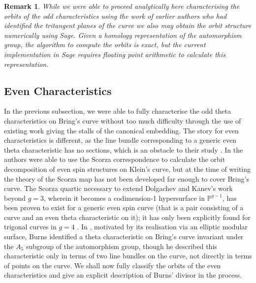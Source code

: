 \documentclass{amsart}
\newtheorem{remark}[theorem]{Remark}
\begin{document}
\begin{remark}
While we were able to proceed analytically here characterising the orbits of the odd characteristics using the  work of earlier authors who had identified the tritangent planes of the curve we also may obtain the orbit structure numerically using Sage. Given a homology representation of the automorphism group, the algorithm to compute the orbits is exact, but the current implementation in Sage requires floating point arithmetic to calculate this representation. 
\end{remark}
\subsection{Even Characteristics}
In the previous subsection, we were able to fully characterise the odd theta characteristics on Bring's curve without too much difficulty through the use of existing work giving the stalls of the canonical embedding. The story for even characteristics is different, as the line bundle corresponding to a generic even theta characteristic has no sections, which is an obstacle to their study \cite{Takagi2009}. In \cite{Dolgachev1993} the authors were able to use the Scorza correspondence to calculate the orbit decomposition of even spin structures on Klein's curve, but at the time of writing the theory of the Scorza map has not been developed far enough to cover Bring's curve. The Scorza quartic necessary to extend Dolgachev and Kanev's work beyond $g=3$, wherein it becomes a codimension-1 hypersurface in $\mathbb{P}^{g-1}$, has been proven to exist for a generic even spin curve (that is a pair consisting of a curve and an even theta characteristic on it); it has only been explicitly found for trigonal curves in $g=4$ \cite{Takagi2009}. In \cite{Burns1983}, motivated by its realisation via an elliptic modular surface, Burns identified a theta characteristic on Bring's curve invariant under the $A_5$ subgroup of the automorphism group, though he described this characteristic only in terms of two line bundles on the curve, not directly in terms of points on the curve. We shall now fully classify the orbits of the even characteristics and give an explicit description of Burns' divisor in the process.
\end{document}
